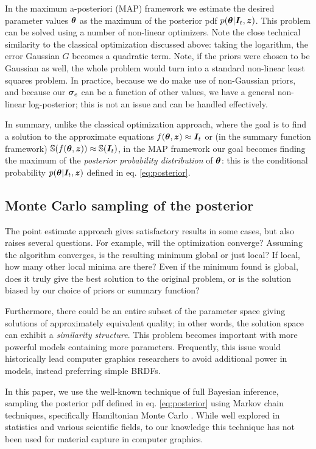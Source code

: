 In the maximum a-posteriori (MAP) framework we estimate the desired parameter values $\bm{\theta}$ as the maximum of the posterior pdf $p(\bm{\theta} | \bm{I}_t, \bm{z})$. This problem can be solved using a number of non-linear optimizers. Note the close technical similarity to the classical optimization discussed above: taking the logarithm, the error Gaussian $G$ becomes a quadratic term. Note, if the priors were chosen to be Gaussian as well, the whole problem would turn into a standard non-linear least squares problem. In practice, because we do make use of non-Gaussian priors, and because our $\bm{\sigma}_e$ can be a function of other values, we have a general non-linear log-posterior; this is not an issue and can be handled effectively.

In summary, unlike the classical optimization approach, where the goal is to find a solution to the approximate equations $f(\bm{\theta}, \bm{z}) \approx \bm{I}_t$ or (in the summary function framework) $\mathbb{S}(f(\bm{\theta}, \bm{z})) \approx \mathbb{S}(\bm{I}_t)$, in the MAP framework our goal becomes finding the maximum of the \emph{posterior probability distribution} of $\bm{\theta}$: this is the conditional probability $p(\bm{\theta} | \bm{I}_t, \bm{z})$ defined in eq. \ref{eq:posterior}.



\subsection{Monte Carlo sampling of the posterior}

The point estimate approach gives satisfactory results in some cases, but also raises several questions. For example, will the optimization converge? Assuming the algorithm converges, is the resulting minimum global or just local? If local, how many other local minima are there? Even if the minimum found is global, does it truly give the best solution to the original problem, or is the solution biased by our choice of priors or summary function?

Furthermore, there could be an entire subset of the parameter space giving solutions of approximately equivalent quality; in other words, the solution space can exhibit a \emph{similarity structure}. This problem becomes important with more powerful models containing more parameters. Frequently, this issue would historically lead computer graphics researchers to avoid additional power in models, instead preferring simple BRDFs.

In this paper, we use the well-known technique of full Bayesian inference, sampling the posterior pdf defined in eq. \ref{eq:posterior} using Markov chain techniques, specifically Hamiltonian Monte Carlo \cite{Betancourt2017}. While well explored in statistics and various scientific fields, to our knowledge this technique has not been used for material capture in computer graphics.

